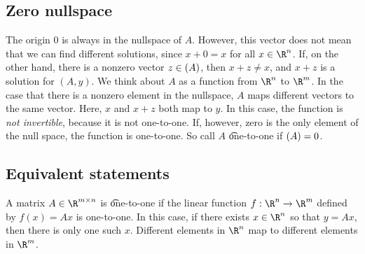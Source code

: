\subsection*{Zero nullspace}

The origin $0$ is always in the nullspace of $A$.
However, this vector does not mean that we can find different solutions, since $x + 0 = x$ for all $x \in \R ^n$.
If, on the other hand, there is a nonzero vector $z \in \null(A)$, then $x + z \neq x$, and $x+z$ is a solution for $(A, y)$.
We think about $A$ as a function from $\R ^n$ to $\R ^m$.
In the case that there is a nonzero element in the nullspace, $A$ maps different vectors to the same vector.
Here, $x$ and $x + z$ both map to $y$.
In this case, the function is \textit{not invertible}, because it is not one-to-one.
If, however, zero is the only element of the null space, the function is one-to-one.
So call $A$ \t{one-to-one} if $\null(A) = 0$.

\subsection*{Equivalent statements}

A matrix $A \in \R ^{m \times n}$ is \t{one-to-one} if the linear function $f: \R ^n \to \R ^m$ defined by $f(x) = Ax$ is one-to-one.
In this case, if there exists $x \in \R ^n$ so that $y = Ax$, then there is only one such $x$.
Different elements in $\R ^n$ map to different elements in $\R ^m$.

\blankpage